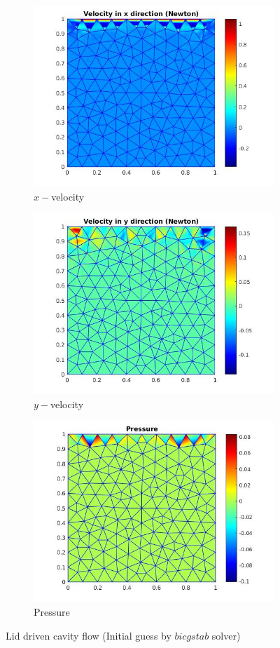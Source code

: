 \documentclass[a4paper,twoside,openright]{book}
\begin{document}
\begin{figure}
  \begin{subfigure}{\textwidth}
    \includegraphics[width=0.8\linewidth]{lid_newton_vx_bicgstab.jpg}
    \caption{$x-$velocity}
  \label{x_vel_navier_stoke_bicgstab_lid}
  \end{subfigure}
  \begin{subfigure}{\textwidth}
    \includegraphics[width=0.8\linewidth]{lid_newton_vy_bicgstab.jpg}
    \caption{$y-$velocity}
  \label{y_vel_navier_stoke_bicgstab_lid}
  \end{subfigure}
  \begin{subfigure}{\textwidth}
    \includegraphics[width=0.8\linewidth]{lid_newton_pressure_bicgstab.jpg}
    \caption{Pressure}
  \label{pressure_navier_stoke_bicgstab_lid}
  \end{subfigure}
\caption{Lid driven cavity flow (Initial guess by $bicgstab$ solver)}
\label{lid_driven_cavity_n_s_bicgstab}
\end{figure}
\end{document}
